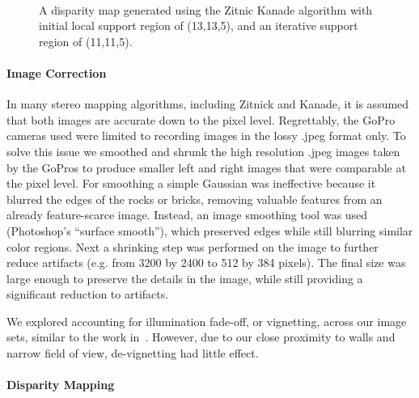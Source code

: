 \documentclass{llncs}
\begin{document}
\begin{figure}[!h]
	\centering
		\quad %
		\\%
		\medskip
		\caption{A disparity map generated using the Zitnic Kanade algorithm with initial local support region of (13,13,5), and an iterative support region of (11,11,5).}
		\label{fig:disparity}
\end{figure}

\paragraph{Image Correction}
In many stereo mapping algorithms, including Zitnick and Kanade, it is assumed that both images are accurate down to the pixel level. Regrettably, the GoPro cameras used were limited to recording images in the lossy .jpeg format only. To solve this issue we smoothed and shrunk the high resolution .jpeg images taken by the GoPros to produce smaller left and right images that were comparable at the pixel level. For smoothing a simple Gaussian was ineffective because it blurred the edges of the rocks or bricks, removing valuable features from an already feature-scarce image. Instead, an image smoothing tool was used (Photoshop's ``surface smooth''), which preserved edges while still blurring similar color regions. Next a shrinking step was performed on the image to further reduce artifacts (e.g. from 3200 by 2400 to 512 by 384 pixels).
The final size was large enough to preserve the details in the image, while still providing a significant reduction to artifacts.

We explored accounting for illumination fade-off, or vignetting, across our image sets, similar to the work in~\cite{stereo:Roberson}. However, due to our close proximity to walls and narrow field of view, de-vignetting had little effect.

\paragraph{Disparity Mapping}
\end{document}
